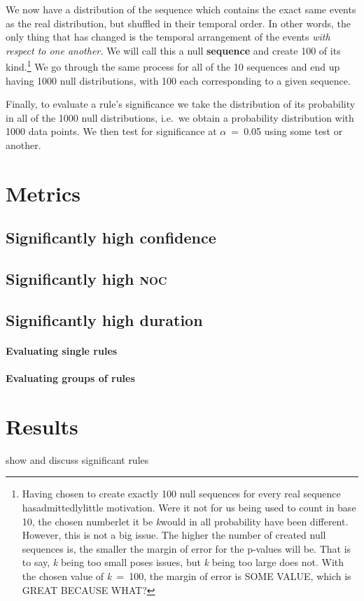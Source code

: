 We now have a distribution of the sequence which contains the exact same events as the real distribution, but shuffled in their temporal order.
In other words, the only thing that has changed is the temporal arrangement of the events \emph{with respect to one another.} We will call this a null \textbf{sequence} and create 100 of its kind.\footnote{Having chosen to create exactly 100 null sequences for every real sequence has\dash admittedly\dash little motivation.
Were it not for us being used to count in base 10, the chosen number\dash let it be \textit{k}\dash would in all probability have been different.
However, this is not a big issue.
The higher the number of created null sequences is, the smaller the margin of error for the p-values will be.
That is to say, \textit{k} being too small poses issues, but \textit{k} being too large does not.
With the chosen value of \textit{k}~=~100, the margin of error is SOME VALUE, which is GREAT BECAUSE WHAT?}
We go through the same process for all of the 10 sequences and end up having 1000 null distributions, with 100 each corresponding to a given sequence.

Finally, to evaluate a rule's significance we take the distribution of its probability in all of the 1000 null distributions, i.e.~we obtain a probability distribution with 1000 data points.
We then test for significance at \(\alpha\)~=~0.05 using some test or another.

%
%

\section{Metrics}
\label{sec:sigmetr}

\subsection{Significantly high confidence}
\subsection{Significantly high \textsc{noc}}
\subsection{Significantly high duration}
\paragraph{Evaluating single rules}
\paragraph{Evaluating groups of rules}
\section{Results}
\label{sec:sigres}
show and discuss significant rules




